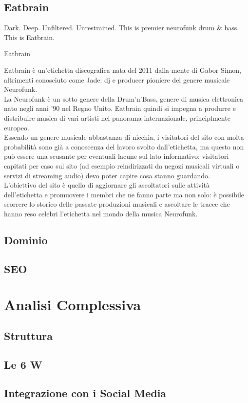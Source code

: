 \documentclass[10pt,a4paper]{article}
\begin{document}
\subsection{Eatbrain}
\setlength{\epigraphwidth}{0.5\textwidth}
\epigraph{Dark. Deep. Unfiltered. Unrestrained. This is premier neurofunk drum \& bass. This is Eatbrain.}{Eatbrain}
Eatbrain è un'etichetta discografica nata del 2011 dalla mente di Gabor Simon, altrimenti conosciuto come Jade: dj e producer pioniere del genere musicale Neurofunk. \\
La Neurofunk è un sotto genere della Drum'n'Bass, genere di musica elettronica nato negli anni '90 nel Regno Unito. Eatbrain quindi si impegna a produrre e distribuire musica di vari artisti nel panorama internazionale, principlmente europeo. \\
Essendo un genere musicale abbastanza di nicchia, i visitatori del sito con molta probabilità sono già a conoscenza del lavoro svolto dall'etichetta, ma questo non può essere una scusante per eventuali lacune sul lato informativo: visitatori capitati per caso sul sito (ad esempio reindirizzati da negozi musicali virtuali o servizi di streaming audio) devo poter capire cosa stanno guardando. \\
L'obiettivo del sito è quello di aggiornare gli ascoltatori sulle attività dell'etichetta e promuovere i membri che ne fanno parte ma non solo: è possibile scorrere lo storico delle passate produzioni musicali e ascoltare le tracce che hanno reso celebri l'etichetta nel mondo della musica Neurofunk. 
\subsection{Dominio}
\subsection{SEO}
\section{Analisi Complessiva}
\subsection{Struttura}
\subsection{Le 6 W}
\subsection{Integrazione con i Social Media}
\end{document}
